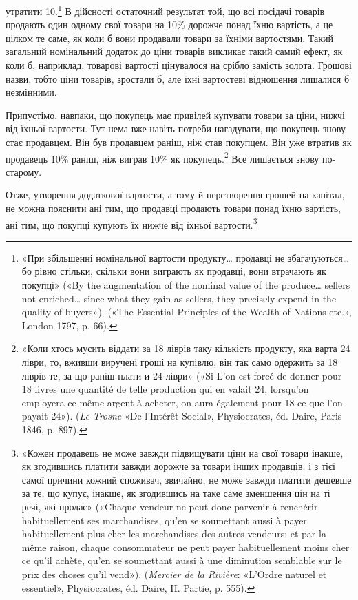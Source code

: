 \parcont{}  %
утратити 10.\footnote{
«При збільшенні номінальної вартости продукту\dots{} продавці не
збагачуються\dots{} бо рівно стільки, скільки вони виграють як продавці,
вони втрачають як покупці» («By the augmentation of the nominal value
of the produce\dots{} sellers not enriched\dots{} since what they gain as sellers, they
prеcisеly expend in the quality of buyers»). («The Essential Principles of
the Wealth of Nations etc.», London 1797, p. 66).
} В дійсності остаточний результат той, що всі посідачі
товарів продають один одному свої товари на 10\% дорожче
понад їхню вартість, а це цілком те саме, як коли б вони продавали
товари за їхніми вартостями. Такий загальний номінальний
додаток до ціни товарів викликає такий самий ефект, як коли б,
наприклад, товарові вартості цінувалося на срібло замість золота.
Грошові назви, тобто ціни товарів, зростали б, але їхні
вартостеві відношення лишалися б незмінними.

Припустімо, навпаки, що покупець має привілей купувати
товари за ціни, нижчі від їхньої вартости. Тут нема вже навіть
потреби нагадувати, що покупець знову стає продавцем. Він
був продавцем раніш, ніж став покупцем. Він уже втратив як
продавець 10\% раніш, ніж виграв 10\% як покупець.\footnote{
«Коли хтось мусить віддати за 18 ліврів таку кількість продукту,
яка варта 24 ліври, то, вживши виручені гроші на купівлю, він так само
одержить за 18 ліврів те, за що раніш плати и 24 ліври» («Si L’on est
forcé de donner pour 18 livres une quantité de telle production qui en valait
24, lorsqu’on employera ce même argent à acheter, on aura également pour
18 ce que l’on payait 24»). (\emph{Le Trosne} «De l’Intérêt Social»,
Physiocrates, éd. Daire, Paris 1846, p. 897).
} Все лишається знову по-старому.

Отже, утворення додаткової вартости, а тому й перетворення
грошей на капітал, не можна пояснити ані тим, що продавці
продають товари понад їхню вартість, ані тим, що покупці купують
їх нижче від їхньої вартости.\footnote{
«Кожен продавець не може завжди підвищувати ціни на свої товари
інакше, як згодившись платити завжди дорожче за товари інших продавців;
і з тієї самої причини кожний споживач, звичайно, не може завжди
платити дешевше за те, що купує, інакше, як згодившись на таке саме зменшення
цін на ті речі, які продає» («Chaque vendeur ne peut donc parvenir
à renchérir habituellement ses marchandises, qu’en se soumettant aussi à
payer habituellement plus cher les marchandises des autres vendeurs; et
par la même raison, chaque consommateur ne peut payer habituellement
moins cher ce qu’il achète, qu’en se soumettant aussi à une diminution
semblable sur le prix des choses qu’il vend»). (\emph{Mercier de la Rivière}:
«L’Ordre naturel et essentiel», Physiocrates, éd. Daire, II. Partie, p. 555).
}

